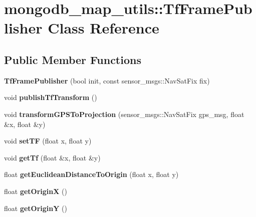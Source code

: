 \hypertarget{classmongodb__map__utils_1_1TfFramePublisher}{}\section{mongodb\+\_\+map\+\_\+utils\+:\+:Tf\+Frame\+Publisher Class Reference}
\label{classmongodb__map__utils_1_1TfFramePublisher}
\subsection*{Public Member Functions}
\begin{DoxyCompactItemize}
\item 
\mbox{\label{classmongodb__map__utils_1_1TfFramePublisher_aafb3f96635b550aee14f148dac63acab}} 
{\bfseries Tf\+Frame\+Publisher} (bool init, const sensor\+\_\+msgs\+::\+Nav\+Sat\+Fix fix)
\item 
\mbox{\label{classmongodb__map__utils_1_1TfFramePublisher_a958251eacdbe716ffacf1e2d44add49d}} 
void {\bfseries publish\+Tf\+Transform} ()
\item 
\mbox{\label{classmongodb__map__utils_1_1TfFramePublisher_a918daaab3e6e716ad6475425ead8a9a9}} 
void {\bfseries transform\+G\+P\+S\+To\+Projection} (sensor\+\_\+msgs\+::\+Nav\+Sat\+Fix gps\+\_\+msg, float \&x, float \&y)
\item 
\mbox{\label{classmongodb__map__utils_1_1TfFramePublisher_a5424190d3f97ab2c97bffdd971ce867c}} 
void {\bfseries set\+TF} (float x, float y)
\item 
\mbox{\label{classmongodb__map__utils_1_1TfFramePublisher_aa35ffeab3f451c47a3cdcae59a6a18e3}} 
void {\bfseries get\+Tf} (float \&x, float \&y)
\item 
\mbox{\label{classmongodb__map__utils_1_1TfFramePublisher_a11200f7312cc30c52f84b5451bf3e3c6}} 
float {\bfseries get\+Euclidean\+Distance\+To\+Origin} (float x, float y)
\item 
\mbox{\label{classmongodb__map__utils_1_1TfFramePublisher_a92f6398c7be43dad4c2f11403574b634}} 
float {\bfseries get\+OriginX} ()
\item 
\mbox{\label{classmongodb__map__utils_1_1TfFramePublisher_a3b74c368d33561f2e47f8f11bc78ee30}} 
float {\bfseries get\+OriginY} ()
\end{DoxyCompactItemize}


